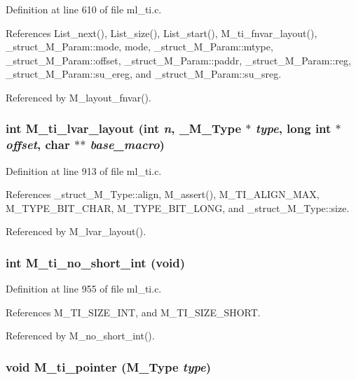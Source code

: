 Definition at line 610 of file ml\_\-ti.c.

References List\_\-next(), List\_\-size(), List\_\-start(), M\_\-ti\_\-fnvar\_\-layout(), \_\-struct\_\-M\_\-Param::mode, mode, \_\-struct\_\-M\_\-Param::mtype, \_\-struct\_\-M\_\-Param::offset, \_\-struct\_\-M\_\-Param::paddr, \_\-struct\_\-M\_\-Param::reg, \_\-struct\_\-M\_\-Param::su\_\-ereg, and \_\-struct\_\-M\_\-Param::su\_\-sreg.

Referenced by M\_\-layout\_\-fnvar().
\subsubsection{\setlength{\rightskip}{0pt plus 5cm}int M\_\-ti\_\-lvar\_\-layout (int {\em n}, \bf{\_\-M\_\-Type} $\ast$ {\em type}, long int $\ast$ {\em offset}, char $\ast$$\ast$ {\em base\_\-macro})}\label{ml__ti_8c_a3bd1781085ae8ea0268ab3c00949cfc}




Definition at line 913 of file ml\_\-ti.c.

References \_\-struct\_\-M\_\-Type::align, M\_\-assert(), M\_\-TI\_\-ALIGN\_\-MAX, M\_\-TYPE\_\-BIT\_\-CHAR, M\_\-TYPE\_\-BIT\_\-LONG, and \_\-struct\_\-M\_\-Type::size.

Referenced by M\_\-lvar\_\-layout().
\subsubsection{\setlength{\rightskip}{0pt plus 5cm}int M\_\-ti\_\-no\_\-short\_\-int (void)}\label{ml__ti_8c_b057548a4ac1ff3213dec888a2e586ce}




Definition at line 955 of file ml\_\-ti.c.

References M\_\-TI\_\-SIZE\_\-INT, and M\_\-TI\_\-SIZE\_\-SHORT.

Referenced by M\_\-no\_\-short\_\-int().
\subsubsection{\setlength{\rightskip}{0pt plus 5cm}void M\_\-ti\_\-pointer (\bf{M\_\-Type} {\em type})}\label{ml__ti_8c_7eed50174a4457c9d4a930ca39cef920}




